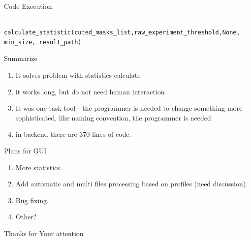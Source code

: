 \documentclass[10pt,usenames,dvipsnames]{beamer}
\begin{document}
\begin{frame}[fragile,c]{Code}
    Execution:
    \begin{lstlisting}
    calculate_statistic(cuted_masks_list,raw_experiment_threshold,None, min_size, result_path)
    \end{lstlisting}
\end{frame}
\begin{frame}[c]{Summarize}
  \begin{enumerate}
    \item It solves problem with statistics calculate
    \item it works long, but do not need human interaction
    \item It was one-task tool - the programmer is needed to change something more sophisticated, 
      like naming convention,
      the programmer is needed
    \item in backend there are 370 lines of code. 
  \end{enumerate}
  
\end{frame}
\begin{frame}[c]{Plans for GUI}
  \begin{enumerate}
    \item More statistics.
    \item Add automatic and multi files processing based on profiles (need discussion).
    \item Bug fixing.
    \item Other?
  \end{enumerate}  
\end{frame}
\begin{frame}
  \begin{center}
    \Huge Thanks for Your attention
  \end{center}
\end{frame}
\end{document}
